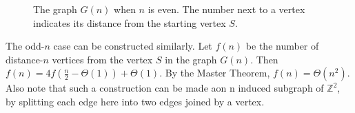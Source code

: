 \documentclass[11pt,a4paper]{amsart}
\theoremstyle{definition}
\theoremstyle{remark}
\begin{document}
\begin{figure}[!htbp]
{
}
\caption{The graph $G(n)$ when $n$ is even. The number next to a vertex indicates its distance from the starting vertex $S$. }
\end{figure}

The odd-$n$ case can be constructed similarly. 
Let $f(n)$ be the number of distance-$n$ vertices from the vertex $S$ in the graph $G(n)$. 
Then $f(n)=4f(\frac{n}{2}-\Theta(1))+\Theta(1)$.
By the Master Theorem, $f(n)=\Theta(n^2)$. 
Also note that such a construction can be made aon n induced subgraph of $\mathbb{Z}^2$, by splitting each edge here into two edges joined by a vertex. 
\end{document}
